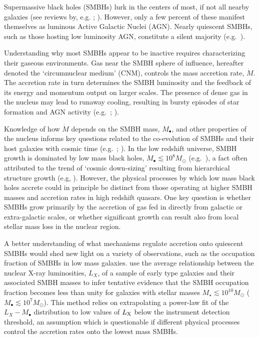 \documentclass[usenatbib,fleqn]{mn2e}
\newcommand{\Mbh}[1][]{M_{\bullet#1}}
\begin{document}
Supermassive black holes (SMBHs) lurk in the centers of most, if not
all nearby galaxies (see reviews by,
e.g. \citealt{KormendyRichstone:1995a};
\citealt{FerrareseFord:2005a}). However, only a few percent of these
manifest themselves as luminous Active Galactic Nuclei (AGN).  Nearly
quiescent SMBHs, such as those hosting low luminosity AGN, constitute
a silent majority (e.g.~\citealt{Ho:2009a}).

Understanding why most SMBHs appear to be inactive requires
characterizing their gaseous environments.  Gas near the SMBH sphere of
influence, hereafter denoted the `circumnuclear medium' (CNM),
controls the mass accretion rate, $\dot{M}$.  The accretion rate in
turn determines the SMBH luminosity and the feedback of its energy and momentum output on larger scales.
The presence of dense gas in the nucleus may lead to runaway cooling, resulting in bursty episodes of star formation and AGN
activity (e.g.~\citealt{Ciotti&Ostriker07}; \citealt{Ciotti+10}).

Knowledge of how $\dot{M}$ depends on the SMBH mass, $\Mbh$, and other
properties of the nucleus informs key questions related to
the co-evolution of SMBHs and their host galaxies with cosmic time
(e.g.~\citealt{Kormendy&Ho13}; \citealt{HeckmanBest:2014a}).  In the low redshift universe, SMBH growth
is dominated by low mass black holes,
$M_{\bullet} \lesssim 10^{8}M_{\odot}$ (e.g.~\citealt{Heckman+04}), a
fact often attributed to the trend of `cosmic
down-sizing' resulting from hierarchical structure growth (e.g,
\citealt{Gallo+08}).  However, the physical processes by which low mass black holes accrete could in principle be distinct from those operating at higher SMBH masses and accretion rates in high redshift quasars.  One key question is
whether SMBHs grow primarily by the accretion of gas fed in directly from
galactic or extra-galactic scales, or whether significant growth
can result also from local stellar mass loss in the nuclear region.

A better understanding of what mechanisms regulate accretion onto
quiescent SMBHs would shed new light on a variety of observations,
such as the occupation fraction of SMBHs in low mass
galaxies.  \citet{Miller+15} use the average relationship between the
nuclear X-ray luminosities, $L_{X}$, of a sample of early type
galaxies and their associated SMBH masses to infer tentative evidence that the
SMBH occupation fraction becomes less than unity for galaxies with stellar
masses $M_{\star} \lesssim 10^{10}M_{\odot}$ ($M_{\bullet} \lesssim
10^{7}M_{\odot}$).  This method relies on extrapolating a power-law
fit of the $L_X-\Mbh$ distribution to low values of $L_{\rm X}$ below
the instrument detection threshold, an assumption which is questionable if
different physical processes control the accretion rates onto the
lowest mass SMBHs.
\end{document}
